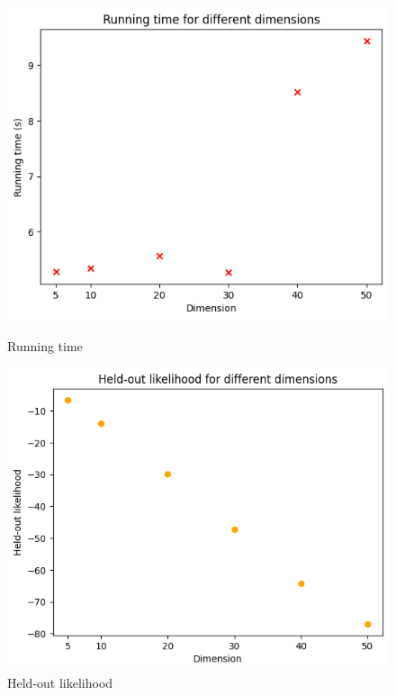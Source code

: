 \documentclass{article}
\begin{document}
\begin{figure}[H]
    \centering
    \begin{minipage}{0.5\textwidth}
        \centering
        \includegraphics[scale=0.4]{images/running time.png}
        \caption{Running time}
    \end{minipage}%
    \begin{minipage}{0.5\textwidth}
        \centering
        \includegraphics[scale=0.4]{images/held-out likelihood.png}
        \caption{Held-out likelihood}
    \end{minipage}
\end{figure}
\end{document}
